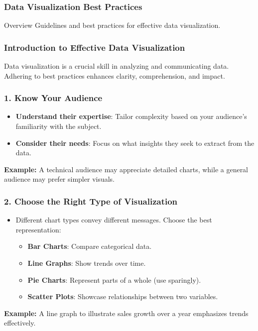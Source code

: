 \documentclass{beamer}
\begin{document}
\begin{frame}[fragile]
    \frametitle{Data Visualization Best Practices}
    \begin{block}{Overview}
        Guidelines and best practices for effective data visualization.
    \end{block}
\end{frame}

\begin{frame}[fragile]
    \frametitle{Introduction to Effective Data Visualization}
    Data visualization is a crucial skill in analyzing and communicating data. Adhering to best practices enhances clarity, comprehension, and impact.
\end{frame}

\begin{frame}[fragile]
    \frametitle{1. Know Your Audience}
    \begin{itemize}
        \item \textbf{Understand their expertise}: Tailor complexity based on your audience’s familiarity with the subject.
        \item \textbf{Consider their needs}: Focus on what insights they seek to extract from the data.
    \end{itemize}
    \textbf{Example:} A technical audience may appreciate detailed charts, while a general audience may prefer simpler visuals.
\end{frame}

\begin{frame}[fragile]
    \frametitle{2. Choose the Right Type of Visualization}
    \begin{itemize}
        \item Different chart types convey different messages. Choose the best representation:
        \begin{itemize}
            \item \textbf{Bar Charts}: Compare categorical data.
            \item \textbf{Line Graphs}: Show trends over time.
            \item \textbf{Pie Charts}: Represent parts of a whole (use sparingly).
            \item \textbf{Scatter Plots}: Showcase relationships between two variables.
        \end{itemize}
    \end{itemize}
    \textbf{Example:} A line graph to illustrate sales growth over a year emphasizes trends effectively.
\end{frame}
\end{document}
